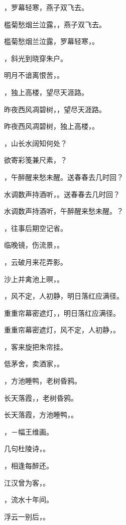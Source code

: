 \documentclass[12pt, a4paper, addpoints]{exam}
\begin{document}
\begin{questions}
\question[3] \fillin，罗幕轻寒，燕子双飞去。

\question[3] 槛菊愁烟兰泣露，\fillin，燕子双飞去。

\question[3] 槛菊愁烟兰泣露，罗幕轻寒，\fillin。

\question[3] \fillin，斜光到晓穿朱户。

\question[3] 明月不谙离恨苦，\fillin。

\question[3] \fillin，独上高楼，望尽天涯路。

\question[3] 昨夜西风凋碧树，\fillin，望尽天涯路。

\question[3] 昨夜西风凋碧树，独上高楼，\fillin。

\question[3] \fillin，山长水阔知何处？

\question[3] 欲寄彩笺兼尺素，\fillin？

\question[3] \fillin，午醉醒来愁未醒。送春春去几时回？

\question[3] 水调数声持酒听，\fillin。送春春去几时回？

\question[3] 水调数声持酒听，午醉醒来愁未醒。\fillin？

\question[3] \fillin，往事后期空记省。

\question[3] 临晚镜，伤流景，\fillin。

\question[3] \fillin，云破月来花弄影。

\question[3] 沙上并禽池上暝，\fillin。

\question[3] \fillin，风不定，人初静，明日落红应满径。

\question[3] 重重帘幕密遮灯，\fillin，明日落红应满径。

\question[3] 重重帘幕密遮灯，风不定，人初静，\fillin。

\question[3] \fillin，客来旋把朱帘挂。

\question[3] 低茅舍，卖酒家，\fillin。

\question[3] \fillin，方池睡鸭，老树昏鸦。

\question[3] 长天落霞，\fillin，老树昏鸦。

\question[3] 长天落霞，方池睡鸭，\fillin。

\question[3] \fillin，－幅王维画。

\question[3] 几句杜陵诗，\fillin。

\question[3] \fillin，相逢每醉还。

\question[3] 江汉曾为客，\fillin。

\question[3] \fillin，流水十年间。

\question[3] 浮云一别后，\fillin。


\end{questions}
\end{document}
